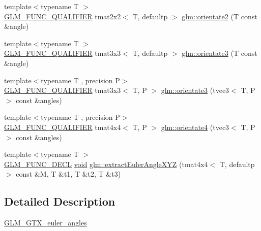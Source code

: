 \begin{DoxyCompactItemize}
{\footnotesize template$<$typename T $>$ }\\\mbox{\hyperlink{setup_8hpp_a33fdea6f91c5f834105f7415e2a64407}{G\+L\+M\+\_\+\+F\+U\+N\+C\+\_\+\+Q\+U\+A\+L\+I\+F\+I\+ER}} tmat2x2$<$ T, defaultp $>$ \mbox{\hyperlink{group__gtx__euler__angles_ga6f465681cbbc575ad93a53ec918dacf3}{glm\+::orientate2}} (T const \&angle)
\item 
{\footnotesize template$<$typename T $>$ }\\\mbox{\hyperlink{setup_8hpp_a33fdea6f91c5f834105f7415e2a64407}{G\+L\+M\+\_\+\+F\+U\+N\+C\+\_\+\+Q\+U\+A\+L\+I\+F\+I\+ER}} tmat3x3$<$ T, defaultp $>$ \mbox{\hyperlink{group__gtx__euler__angles_gab188e2526dea3c003e86e298f618085e}{glm\+::orientate3}} (T const \&angle)
\item 
{\footnotesize template$<$typename T , precision P$>$ }\\\mbox{\hyperlink{setup_8hpp_a33fdea6f91c5f834105f7415e2a64407}{G\+L\+M\+\_\+\+F\+U\+N\+C\+\_\+\+Q\+U\+A\+L\+I\+F\+I\+ER}} tmat3x3$<$ T, P $>$ \mbox{\hyperlink{group__gtx__euler__angles_ga33f0d790cecd8337ee83f8e3a8109b11}{glm\+::orientate3}} (tvec3$<$ T, P $>$ const \&angles)
\item 
{\footnotesize template$<$typename T , precision P$>$ }\\\mbox{\hyperlink{setup_8hpp_a33fdea6f91c5f834105f7415e2a64407}{G\+L\+M\+\_\+\+F\+U\+N\+C\+\_\+\+Q\+U\+A\+L\+I\+F\+I\+ER}} tmat4x4$<$ T, P $>$ \mbox{\hyperlink{group__gtx__euler__angles_ga4e25c9468b6f002c76e9a2412bcfa503}{glm\+::orientate4}} (tvec3$<$ T, P $>$ const \&angles)
\item 
{\footnotesize template$<$typename T $>$ }\\\mbox{\hyperlink{setup_8hpp_ab2d052de21a70539923e9bcbf6e83a51}{G\+L\+M\+\_\+\+F\+U\+N\+C\+\_\+\+D\+E\+CL}} \mbox{\hyperlink{glad_8h_a950fc91edb4504f62f1c577bf4727c29}{void}} \mbox{\hyperlink{group__gtx__euler__angles_gad5838a4c87ce2b8ee4c4e17bd162fd14}{glm\+::extract\+Euler\+Angle\+X\+YZ}} (tmat4x4$<$ T, defaultp $>$ const \&M, T \&t1, T \&t2, T \&t3)
\end{DoxyCompactItemize}


\subsection{Detailed Description}
\mbox{\hyperlink{group__gtx__euler__angles}{G\+L\+M\+\_\+\+G\+T\+X\+\_\+euler\+\_\+angles}} 